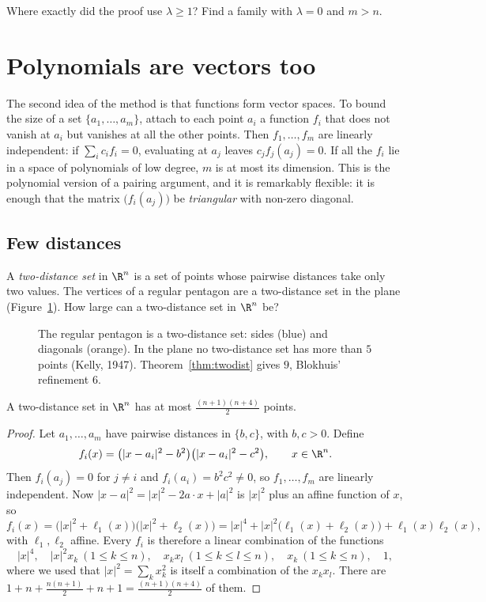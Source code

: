 \begin{think}
Where exactly did the proof use $\lambda\ge1$? Find a family with $\lambda=0$ and $m>n$.
\end{think}

\section{Polynomials are vectors too}

The second idea of the method is that functions form vector spaces. To bound the size of a set $\{a_1,\dots,a_m\}$, attach to each point $a_i$ a function $f_i$ that does not vanish at
$a_i$ but vanishes at all the other points. Then $f_1,\dots,f_m$ are linearly independent: if $\sum_ic_if_i=0$, evaluating at $a_j$ leaves $c_jf_j(a_j)=0$. If all the $f_i$ lie in a
space of polynomials of low degree, $m$ is at most its dimension. This is the polynomial version of a pairing argument, and it is remarkably flexible: it is enough that the matrix
$\bigl(f_i(a_j)\bigr)$ be \emph{triangular} with non-zero diagonal.

\subsection*{Few distances}

A \emph{two-distance set} in $\R^n$ is a set of points whose pairwise distances take only two values. The vertices of a regular pentagon are a two-distance set in the plane (Figure~\ref{fig:pentagon}).
How large can a two-distance set in $\R^n$ be?

\begin{figure}[ht]
\centering
{}
\caption{The regular pentagon is a two-distance set: sides (blue) and diagonals (orange). In the plane no two-distance set has more than $5$ points (Kelly, 1947). Theorem~\ref{thm:twodist} gives $9$, Blokhuis' refinement $6$.}
\label{fig:pentagon}
\end{figure}

\begin{theorem}\label{thm:twodist}
A two-distance set in $\R^n$ has at most $\frac{(n+1)(n+4)}2$ points.
\end{theorem}
\begin{proof}
Let $a_1,\dots,a_m$ have pairwise distances in $\{b,c\}$, with $b,c>0$. Define
\[
f_i(x)=\bigl(|x-a_i|^2-b^2\bigr)\bigl(|x-a_i|^2-c^2\bigr),\qquad x\in\R^n.
\]
Then $f_i(a_j)=0$ for $j\ne i$ and $f_i(a_i)=b^2c^2\ne0$, so $f_1,\dots,f_m$ are linearly independent. Now $|x-a|^2=|x|^2-2a\cdot x+|a|^2$ is $|x|^2$ plus an affine function of $x$, so
\[
f_i(x)=\bigl(|x|^2+\ell_1(x)\bigr)\bigl(|x|^2+\ell_2(x)\bigr)=|x|^4+|x|^2\bigl(\ell_1(x)+\ell_2(x)\bigr)+\ell_1(x)\ell_2(x),
\]
with $\ell_1,\ell_2$ affine. Every $f_i$ is therefore a linear combination of the functions
\[
|x|^4,\quad |x|^2x_k\ (1\le k\le n),\quad x_kx_l\ (1\le k\le l\le n),\quad x_k\ (1\le k\le n),\quad 1,
\]
where we used that $|x|^2=\sum_kx_k^2$ is itself a combination of the $x_kx_l$. There are $1+n+\frac{n(n+1)}2+n+1=\frac{(n+1)(n+4)}2$ of them.
\end{proof}

